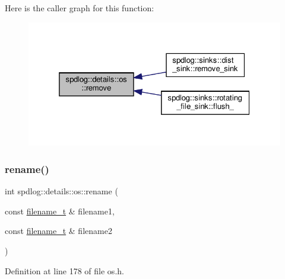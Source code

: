 Here is the caller graph for this function\+:
\nopagebreak
\begin{figure}[H]
\begin{center}
\leavevmode
\includegraphics[width=325pt]{namespacespdlog_1_1details_1_1os_a08477012dc14c38d86657b40edd2f534_icgraph}
\end{center}
\end{figure}
\mbox{\label{namespacespdlog_1_1details_1_1os_a88940402c9b1b8c9d01ea7dae8f26127}} 
\subsubsection{\texorpdfstring{rename()}{rename()}}
{\footnotesize\ttfamily int spdlog\+::details\+::os\+::rename (\begin{DoxyParamCaption}\item[{const \hyperlink{namespacespdlog_acf7ce125b3622e44f8f1702d699e0b06}{filename\+\_\+t} \&}]{filename1,  }\item[{const \hyperlink{namespacespdlog_acf7ce125b3622e44f8f1702d699e0b06}{filename\+\_\+t} \&}]{filename2 }\end{DoxyParamCaption})\hspace{0.3cm}{\ttfamily [inline]}}



Definition at line 178 of file os.\+h.

